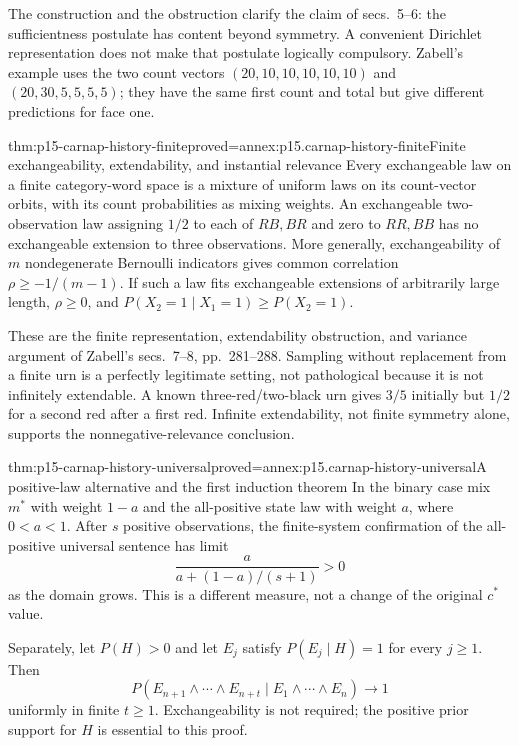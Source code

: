 The construction and the obstruction clarify the claim of secs.~5--6:
the sufficientness postulate has content beyond symmetry. A convenient
Dirichlet representation does not make that postulate logically
compulsory. Zabell's example uses the two count vectors
\((20,10,10,10,10,10)\) and \((20,30,5,5,5,5)\); they have the
same first count and total but give different predictions for face one.

\begin{hbtheorem}{thm:p15-carnap-history-finite}{proved=annex:p15.carnap-history-finite}{Finite exchangeability, extendability, and instantial relevance}
Every exchangeable law on a finite category-word space is a mixture of
uniform laws on its count-vector orbits, with its count probabilities as
mixing weights. An exchangeable two-observation law assigning \(1/2\)
to each of \(RB,BR\) and zero to \(RR,BB\) has no exchangeable
extension to three observations. More generally, exchangeability of
\(m\) nondegenerate Bernoulli indicators gives common correlation
\(\rho\geq-1/(m-1)\). If such a law fits exchangeable extensions
of arbitrarily large length, \(\rho\geq0\), and
\(P(X_2=1\mid X_1=1)\geq P(X_2=1)\).
\end{hbtheorem}

These are the finite representation, extendability obstruction, and
variance argument of Zabell's secs.~7--8, pp.~281--288. Sampling
without replacement from a finite urn is a perfectly legitimate setting,
not pathological because it is not infinitely extendable. A known
three-red/two-black urn gives \(3/5\) initially but \(1/2\) for a
second red after a first red. Infinite extendability, not finite symmetry
alone, supports the nonnegative-relevance conclusion.

\begin{hbtheorem}{thm:p15-carnap-history-universal}{proved=annex:p15.carnap-history-universal}{A positive-law alternative and the first induction theorem}
In the binary case mix \(m^*\) with weight \(1-a\) and the
all-positive state law with weight \(a\), where \(0<a<1\).
After \(s\) positive observations, the finite-system confirmation of
the all-positive universal sentence has limit
\[
 \frac{a}{a+(1-a)/(s+1)}>0
\]
as the domain grows. This is a different measure, not a change of the
original \(c^*\) value.

Separately, let \(P(H)>0\) and let \(E_j\) satisfy
\(P(E_j\mid H)=1\) for every \(j\geq1\). Then
\[
 P(E_{n+1}\land\cdots\land E_{n+t}\mid E_1\land\cdots\land E_n)
 \longrightarrow1
\]
uniformly in finite \(t\geq1\). Exchangeability is not required;
the positive prior support for \(H\) is essential to this proof.
\end{hbtheorem}

